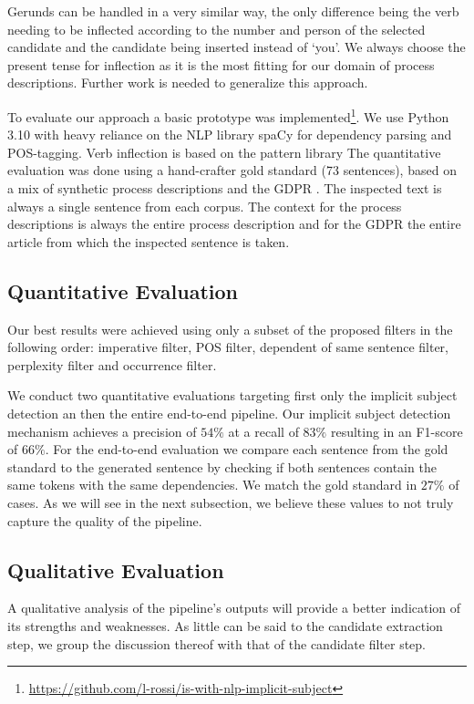 \documentclass[times, 10pt,twocolumn]{article}
\begin{document}
Gerunds can be handled in a very similar way, the only difference being the verb needing to be
inflected according to the number and person of the selected candidate and the candidate being
inserted instead of `you'. We always choose
the present tense for inflection as it is the most fitting for our domain of process descriptions.
Further work is needed to generalize this approach.



To evaluate our approach a basic prototype was implemented\footnote{\url{https://github.com/l-rossi/is-with-nlp-implicit-subject}}.
We use Python 3.10 \cite{python} with heavy reliance on the NLP library 
spaCy \cite{spacy} for dependency parsing and POS-tagging. Verb inflection
is based on the pattern library \cite{pattern_library}
The quantitative evaluation was done using a hand-crafter gold standard (73 sentences),
based on a mix of synthetic process descriptions \cite{NLP_bpm_data} and the GDPR \cite{gdpr}.
The inspected text is always a single sentence from each corpus. The context for the process descriptions
is always the entire process description and for the GDPR the entire article from which the inspected sentence
is taken.

\subsection{Quantitative Evaluation}
Our best results were achieved using only a subset of the proposed filters in the following order:
imperative filter, POS filter, dependent of same sentence filter, perplexity filter and occurrence filter.

We conduct two quantitative evaluations targeting first only the implicit subject detection an then
the entire end-to-end pipeline. 
Our implicit subject detection mechanism achieves a precision of \(54\%\) at a recall of \(83\%\)
resulting in an F1-score of \(66\%\).
For the end-to-end evaluation we compare each sentence from the gold standard to the generated sentence
by checking if both sentences contain the same tokens with the same dependencies. We match the gold
standard in \(27\%\) of cases.
As we will see in the next subsection, we believe these values to not truly capture the quality
of the pipeline. 

\subsection{Qualitative Evaluation}
A qualitative analysis of the pipeline's outputs will provide a better indication of its strengths
and weaknesses. As little can be said to the candidate extraction step, we group the discussion
thereof with that of the candidate filter step.
\end{document}
